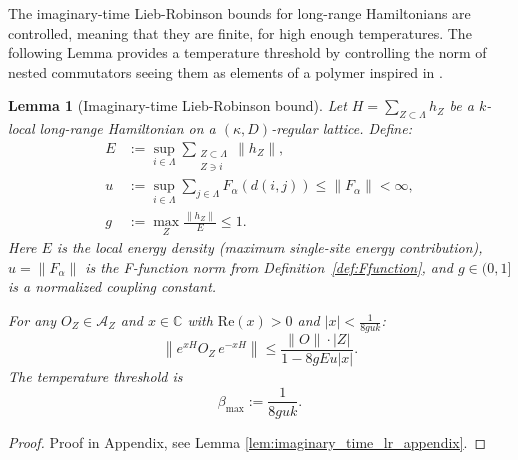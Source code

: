 \documentclass[11pt]{article}
\numberwithin{equation}{section}
\numberwithin{figure}{section}
\numberwithin{table}{section}
\theoremstyle{definition}
\theoremstyle{plain}
\newtheorem{lem}[thm]{Lemma}
\theoremstyle{remark}
\newcommand{\A}{\mathcal{A}}
\newcommand{\abs}[1]{\left \vert#1\right\vert}
\begin{document}
The imaginary-time Lieb-Robinson bounds for long-range Hamiltonians are controlled, meaning that they are finite, for high enough temperatures. The following Lemma provides a temperature threshold by controlling the norm of nested commutators seeing them as elements of a polymer inspired in \cite{sanchez-segovia_high-temperature_2025}.

\medskip
\begin{lem}[Imaginary-time Lieb-Robinson bound]
\label{lem:imaginary_time_lr}
Let $H = \sum_{Z \subset \Lambda} h_Z$ be a $k$-local long-range Hamiltonian
on a $(\kappa, D)$-regular lattice. Define:
\begin{align}
    E &:= \sup_{i \in \Lambda}\sum_{\substack{Z \subset \Lambda \\ Z \ni i}}
    \|h_Z\|, \label{eq:local_energyMain}\\
    u &:= \sup_{i \in \Lambda} \sum_{j \in \Lambda} F_\alpha(d(i,j))
    \leq \|F_\alpha\| < \infty, \label{eq:u_defMain}\\
    g &:= \max_{Z} \frac{\|h_Z\|}{E} \leq 1. \label{eq:g_defMain}
\end{align}
Here $E$ is the local energy density (maximum single-site energy contribution),
$u = \|F_\alpha\|$ is the F-function norm from Definition~\ref{def:Ffunction},
and $g \in (0,1]$ is a normalized coupling constant.

For any $O_Z \in \A_Z$ and $x \in \mathbb{C}$ with
$\mathrm{Re}(x) > 0$ and $|x| < \frac{1}{8guk}$:
\begin{equation}
    \left\|e^{xH} O_Z\, e^{-xH}\right\| \leq \frac{\|O\|\cdot \abs{Z}}{1 - 8gEu|x|}.
    \label{eq:imag_lrMain}
\end{equation}
The temperature threshold is 
\begin{equation}
    \beta_{\max} := \frac{1}{8guk}.
    \label{eq:temperatureThreshold}
\end{equation}
\end{lem}

\begin{proof}
    Proof in Appendix, see Lemma \ref{lem:imaginary_time_lr_appendix}.
\end{proof}
\end{document}
